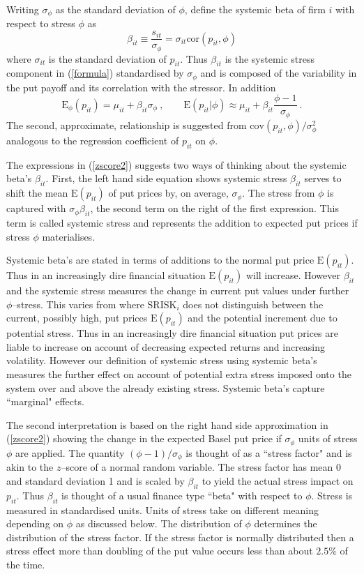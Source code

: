 \documentclass[authoryear]{elsarticle}
\newcommand{\E}{\mathrm{E}}
\newcommand{\cov}{\mathrm{cov}}
\newcommand{\Es}{\E_\phi}
\newcommand{\cor}{\mathrm{cor}}
\newcommand{\eref}[1]{(\ref{#1})}
\newcommand{\cq}{\ , \qquad}
\newcommand{\be}[1]{\begin{equation}\label{#1}}
\newcommand{\ee}{\end{equation}}
\begin{document}
Writing  $\sigma_{\phi}$ as the standard deviation of $\phi$,  define the systemic beta of firm $i$ with respect to stress $\phi$ as
\be{zscore}
\beta_{it}\equiv \frac{s_{it}}{\sigma_\phi} = \sigma_{it}\cor(p_{it},\phi)
\ee
where $\sigma_{it}$ is the standard deviation of $p_{it}$.   Thus $\beta_{it}$ is the systemic stress component in \eref{formula} standardised by $\sigma_\phi$ and is composed of the variability in the put payoff and its correlation with the stressor. In addition
\be{zscore2}
\Es(p_{it})  = \mu_{it} + \beta_{it}\sigma_\phi\cq \E(p_{it}|\phi) \approx \mu_{it} + \beta_{it}\frac{\phi-1}{\sigma_\phi}\ .
\ee
The second, approximate, relationship is suggested from   $\cov(p_{it},\phi)/\sigma^2_\phi$ analogous to the regression coefficient of $p_{it}$ on $\phi$.

The expressions in \eref{zscore2} suggests two ways of  thinking about the  systemic beta's  $\beta_{it}$.   First, the left hand side equation shows systemic stress $\beta_{it}$ serves to shift the mean $\E(p_{it})$ of put prices  by, on average, $\sigma_\phi$.    The stress from $\phi$ is captured with $\sigma_\phi\beta_{it}$, the second term on the right of the first expression.   This term is called systemic stress and represents the addition to expected put prices if stress $\phi$ materialises.

Systemic beta's are stated in terms of additions to the normal put price $\E(p_{it})$. Thus in an increasingly dire financial situation $\E(p_{it})$ will increase.   However  $\beta_{it}$ and the systemic stress measures the  change in current put values  under  further $\phi$--stress.  This varies from  \cite{brownlees2015} where $\mathrm{SRISK}_i$ does not distinguish between the current, possibly high, put prices $\E(p_{it})$ and the potential  increment due to potential stress.   Thus in an increasingly dire financial situation put prices are liable to increase on account of decreasing expected returns and increasing volatility.   However our definition of systemic stress using systemic beta's measures the further effect on account of potential extra stress imposed onto the system over and above the already existing stress.   Systemic beta's capture   ``marginal" effects.

The second interpretation is based on  the right hand side approximation in \eref{zscore2} showing   the change in the  expected Basel put price if  $\sigma_\phi$ units of stress $\phi$ are applied.  The quantity $(\phi-1)/\sigma_\phi$ is thought of as a ``stress factor" and is akin to the $z$--score of a normal random variable.  The stress factor has mean 0 and standard deviation 1 and is scaled by $\beta_{it}$ to yield the actual stress impact on  $p_{it}$.  Thus  $\beta_{it}$ is thought of a usual finance type ``beta" with respect to $\phi$.   Stress is measured in standardised units.  Units of stress take on different meaning depending on  $\phi$ as discussed below. The distribution of $\phi$ determines the distribution of the stress factor. If the stress factor is normally distributed then a stress effect more than doubling of the put value  occurs less than about $2.5\%$ of the time.
\end{document}
